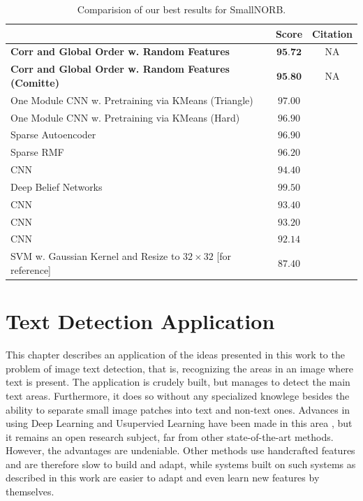 \documentclass[12pt,a4paper,oneside,english]{UPBThesis}
\newcommand{\hctimes}[2]{{#1}\!\times\!{#2}}
\begin{document}
\renewcommand{\arraystretch}{1.2}
\begin{table}
  \caption{Comparision of our best results for SmallNORB.}
  \label{table:FinalPerformanceEvaluationNORBSmallNormal}
  \begin{tabularx}{\textwidth}{|X|cc|}
    \hline
    \centering{Method} & Score & Citation \\
    \hline\hline
    \textbf{Corr and Global Order w. Random Features} & $\textbf{95.72}$ & NA \\
    \textbf{Corr and Global Order w. Random Features (Comitte)} & $\textbf{95.80}$ & NA \\
    One Module CNN w. Pretraining via KMeans (Triangle) & $97.00$ & \cite{analysis-single-layer-networks} \\
    One Module CNN w. Pretraining via KMeans (Hard) & $96.90$ & \cite{analysis-single-layer-networks} \\
    Sparse Autoencoder & $96.90$ & \cite{analysis-single-layer-networks} \\
    Sparse RMF & $96.20$ & \cite{analysis-single-layer-networks} \\
    CNN & $94.40$ & \cite{best-architecture-object-recognition} \\
    Deep Belief Networks & $99.50$ & \cite{3d-object-deep-belief-nets} \\
    CNN & $93.40$ & \cite{learning-methods-invariance-pose-lighting} \\
    CNN & $93.20$ & \cite{learning-methods-invariance-pose-lighting} \\
    CNN & $92.14$ & \cite{high-performance-nn-object-classification} \\
    SVM w. Gaussian Kernel and Resize to $\hctimes{32}{32}$ [for reference] & $87.40$ & \cite{learning-methods-invariance-pose-lighting} \\
    \hline
  \end{tabularx}
\end{table}
\renewcommand{\arraystretch}{1.0}

\chapter{Text Detection Application}
\label{chap:TextDetectionApplication}

This chapter describes an application of the ideas presented in this work to the problem of image text detection, that is, recognizing the areas in an image where text is present. The application is crudely built, but manages to detect the main text areas. Furthermore, it does so without any specialized knowlege besides the ability to separate small image patches into text and non-text ones. Advances in using Deep Learning and Usupervied Learning have been made in this area \cite{text-detection-character-recognition-unsupervised-feature-learning} , but it remains an open research subject, far from other state-of-the-art methods. However, the advantages are undeniable. Other methods use handcrafted features and are therefore slow to build and adapt, while systems built on such systems as described in this work are easier to adapt and even learn new features by themselves.
\end{document}
